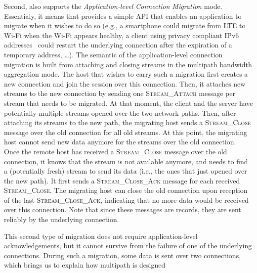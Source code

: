 Second, \tcpls also supports the \textit{Application-level Connection Migration} mode. Essentialy, it means that \tcpls provides a simple API that enables an application to migrate when it wishes to do so (e.g., a smartphone could migrate from LTE to Wi-Fi when the Wi-Fi appears healthy, a client using privacy compliant IPv6 addresses~\cite{rfc4941} could restart the underlying \tcp connection after the expiration of a temporary address, \ldots). The semantic of the application-level connection migration is built from attaching and closing streams in the multipath bandwidth aggregation mode. The host that wishes to carry such a migration first creates a new \tcp connection and join the \tcpls session over this connection. Then, it attaches new streams to the new connection by sending one \textsc{Stream\_Attach} message per stream that needs to be migrated. At that moment, the client and the server have potentially multiple streams opened over the two network paths. Then, after attaching its streams to the new path, the migrating host sends a \textsc{Stream\_Close} message over the old \tcp connection for all old streams. At this point, the migrating host cannot send new data anymore for
the streams over the old connection. Once the remote host has received a
\textsc{Stream\_Close} message over the old \tcp connection, it knows that the
stream is not available anymore, and needs to find a (potentially fresh) stream to send its data (i.e., the ones that just opened over the new path). It first sends a \textsc{Stream\_Close\_Ack} message for each received \textsc{Stream\_Close}. The migrating host can close the old connection upon reception of the last \textsc{Stream\_Close\_Ack}, indicating that no more data would be received over this connection. Note that since these messages are \tls records, they are sent reliably by the underlying \tcp connection.

This second type of migration does not require application-level acknowledgements, but it cannot survive from the failure of one of the underlying connections. During such a migration, some data is sent over two connections, which brings us to explain how multipath is designed



